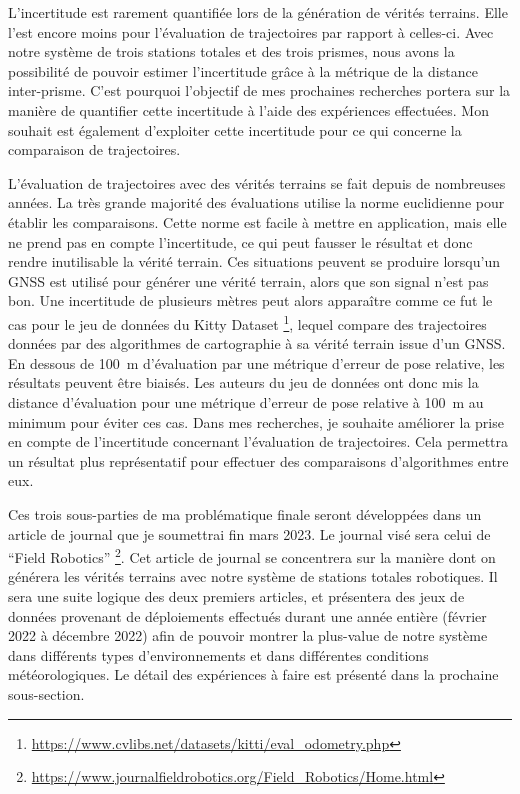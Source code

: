 L'incertitude est rarement quantifiée lors de la génération de vérités terrains.
Elle l'est encore moins pour l'évaluation de trajectoires par rapport à celles-ci.
Avec notre système de trois stations totales et des trois prismes, nous avons la possibilité de pouvoir estimer l'incertitude grâce à la métrique de la distance inter-prisme.
C'est pourquoi l'objectif de mes prochaines recherches portera sur la manière de quantifier cette incertitude à l'aide des expériences effectuées.
Mon souhait est également d'exploiter cette incertitude pour ce qui concerne la comparaison de trajectoires.

L'évaluation de trajectoires avec des vérités terrains se fait depuis de nombreuses années.
La très grande majorité des évaluations utilise la norme euclidienne pour établir les comparaisons.
Cette norme est facile à mettre en application, mais elle ne prend pas en compte l'incertitude, ce qui peut fausser le résultat et donc rendre inutilisable la vérité terrain.
Ces situations peuvent se produire lorsqu'un \ac{GNSS} est utilisé pour générer une vérité terrain, alors que son signal n'est pas bon.
Une incertitude de plusieurs mètres peut alors apparaître comme ce fut le cas pour le jeu de données du Kitty Dataset \footnote{\url{https://www.cvlibs.net/datasets/kitti/eval_odometry.php}}, lequel compare des trajectoires données par des algorithmes de cartographie à sa vérité terrain issue d'un \ac{GNSS}.
En dessous de \SI{100}{m} d'évaluation par une métrique d'erreur de pose relative, les résultats peuvent être biaisés.
Les auteurs du jeu de données ont donc mis la distance d'évaluation pour une métrique d'erreur de pose relative à \SI{100}{m} au minimum pour éviter ces cas.
Dans mes recherches, je souhaite améliorer la prise en compte de l'incertitude concernant l'évaluation de trajectoires.
Cela permettra un résultat plus représentatif pour effectuer des comparaisons d'algorithmes entre eux.

Ces trois sous-parties de ma problématique finale seront développées dans un article de journal que je soumettrai fin mars 2023.
Le journal visé sera celui de ``Field Robotics'' \footnote{\url{https://www.journalfieldrobotics.org/Field_Robotics/Home.html}}.
Cet article de journal se concentrera sur la manière dont on générera les vérités terrains avec notre système de stations totales robotiques.
Il sera une suite logique des deux premiers articles, et présentera des jeux de données provenant de déploiements effectués durant une année entière (février 2022 à décembre 2022) afin de pouvoir montrer la plus-value de notre système dans différents types d'environnements et dans différentes conditions météorologiques.
Le détail des expériences à faire est présenté dans la prochaine sous-section.

